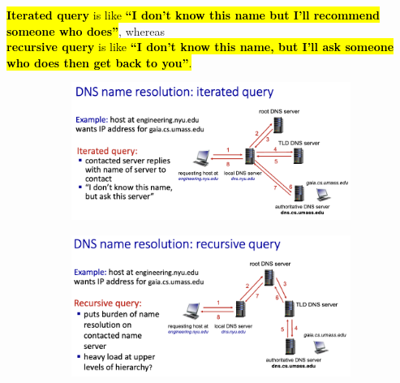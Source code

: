 \documentclass[12pt,a4paper]{article}
\begin{document}


\noindent \hl{\textbf{Iterated query} is like \textbf{``I don't know this name but I'll recommend someone who does''}}, whereas \\ \hl{\textbf{recursive query} is like \textbf{``I don't know this name, but I'll ask someone who does then get back to you''}.}

\begin{figure}[h]
  \centering
  \begin{subfigure}[t]{0.48\textwidth}
    \centering
    \includegraphics[width=\textwidth]{ch2_img/iterated_query.png}
  \end{subfigure}
  \hfill
  \begin{subfigure}[t]{0.48\textwidth}
    \centering
    \includegraphics[width=\textwidth]{ch2_img/recursive_query.png}
  \end{subfigure}
\end{figure}
\end{document}
